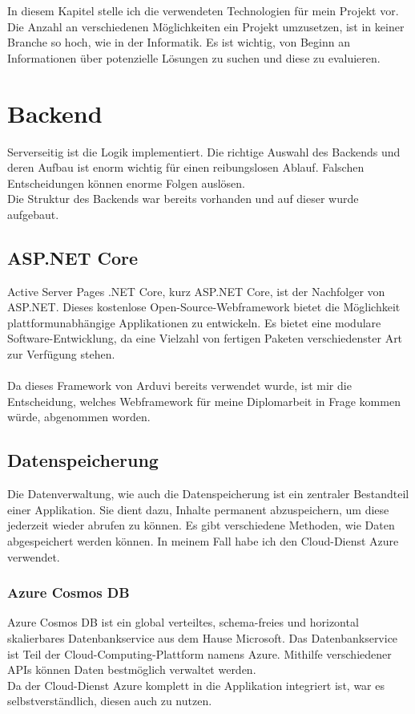 In diesem Kapitel stelle ich die verwendeten Technologien für mein Projekt vor.
\\
Die Anzahl an verschiedenen Möglichkeiten ein Projekt umzusetzen, ist in keiner 
Branche so hoch, wie in der Informatik. Es ist wichtig, von Beginn an Informationen 
über potenzielle Lösungen zu suchen und diese zu evaluieren.

\section{Backend}
Serverseitig ist die Logik implementiert. Die richtige Auswahl des Backends und deren Aufbau ist
enorm wichtig für einen reibungslosen Ablauf. Falschen Entscheidungen können enorme Folgen auslösen.
\\
Die Struktur des Backends war bereits vorhanden und auf dieser wurde aufgebaut.

    \subsection{ASP.NET Core}
    Active Server Pages .NET Core, kurz ASP.NET Core, ist der Nachfolger von ASP.NET. Dieses kostenlose
    Open-Source-Webframework bietet die Möglichkeit plattformunabhängige Applikationen zu entwickeln. 
    Es bietet eine modulare Software-Entwicklung, da eine Vielzahl von fertigen Paketen verschiedenster 
    Art zur Verfügung stehen.
    \\\\
    Da dieses Framework von Arduvi bereits verwendet wurde, ist mir die Entscheidung, welches
    Webframework für meine Diplomarbeit in Frage kommen würde, abgenommen worden.

    \subsection{Datenspeicherung}
    Die Datenverwaltung, wie auch die Datenspeicherung ist ein zentraler Bestandteil
    einer Applikation. Sie dient dazu, Inhalte permanent abzuspeichern, um diese jederzeit 
    wieder abrufen zu können. Es gibt verschiedene Methoden, wie Daten abgespeichert werden können.
    In meinem Fall habe ich den Cloud-Dienst Azure verwendet.

        \subsubsection{Azure Cosmos DB}
        Azure Cosmos DB ist ein global verteiltes, schema-freies und horizontal skalierbares 
        Datenbankservice aus dem Hause Microsoft. Das Datenbankservice ist Teil der Cloud-Computing-Plattform namens Azure.
        Mithilfe verschiedener APIs können Daten bestmöglich verwaltet werden.
        \\
        Da der Cloud-Dienst Azure komplett in die Applikation integriert ist, war es selbstverständlich,
        diesen auch zu nutzen.

